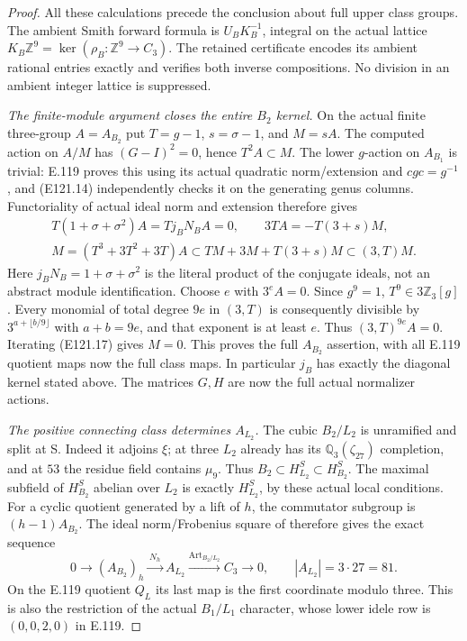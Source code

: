 \begin{proof}
All these calculations precede the conclusion about full
upper class groups. The ambient Smith forward formula is
$U_BK_B^{-1}$, integral on the actual lattice
$K_B\mathbb Z^9=\ker(\rho_B:\mathbb Z^9\to C_3)$.
The retained certificate encodes its ambient rational entries
exactly and verifies both inverse compositions. No division
in an ambient integer lattice is suppressed.

\emph{The finite-module argument closes the entire $B_2$ kernel.}
On the actual finite three-group $A=A_{B_2}$ put
$T=g-1$, $s=\sigma-1$, and $M=sA$.
The computed action on $A/M$ has $(G-I)^2=0$, hence
$T^2A\subset M$. The lower $g$-action on $A_{B_1}$ is trivial:
E.119 proves this using its actual quadratic norm/extension
and $cgc=g^{-1}$, and (E121.14) independently checks it on
the generating genus columns.
Functoriality of actual ideal norm and extension therefore gives
\[
 \begin{gathered}
 T(1+\sigma+\sigma^2)A=Tj_BN_BA=0,\qquad
 3TA=-T(3+s)M,\\
 M=(T^3+3T^2+3T)A
      \subset TM+3M+T(3+s)M\subset(3,T)M.
 \end{gathered}
 \tag{E121.17}
\]
Here $j_BN_B=1+\sigma+\sigma^2$ is the literal product of
the conjugate ideals, not an abstract module identification.
Choose $e$ with $3^eA=0$. Since $g^9=1$,
$T^9\in3\mathbb Z_3[g]$. Every monomial of total degree
$9e$ in $(3,T)$ is consequently divisible by
$3^{a+\lfloor b/9\rfloor}$ with $a+b=9e$, and that exponent
is at least $e$. Thus $(3,T)^{9e}A=0$.
Iterating (E121.17) gives $M=0$. This proves the full
$A_{B_2}$ assertion, with all E.119 quotient maps now
the full class maps. In particular $j_B$ has exactly the
diagonal kernel stated above. The matrices $G,H$ are now
the full actual normalizer actions.

\emph{The positive connecting class determines $A_{L_2}$.}
The cubic $B_2/L_2$ is unramified and split at S.
Indeed it adjoins $\xi$; at three $L_2$ already has its
$\mathbb Q_3(\zeta_{27})$ completion, and at $53$ the
residue field contains $\mu_9$.
Thus $B_2\subset H^S_{L_2}\subset H^S_{B_2}$.
The maximal subfield of $H^S_{B_2}$ abelian over $L_2$
is exactly $H^S_{L_2}$, by these actual local conditions.
For a cyclic quotient generated by a lift of $h$, the
commutator subgroup is $(h-1)A_{B_2}$. The ideal
norm/Frobenius square of \cite[V,Proposition3.3]{E_MilneCFT}
therefore gives the exact sequence
\[
 0\longrightarrow(A_{B_2})_h
   \xrightarrow{\,N_h\,} A_{L_2}
   \xrightarrow{\operatorname{Art}_{B_2/L_2}}C_3
   \longrightarrow0,\qquad |A_{L_2}|=3\cdot27=81.
 \tag{E121.18}
\]
On the E.119 quotient $Q_L$ its last map is the first
coordinate modulo three. This is also the restriction of
the actual $B_1/L_1$ character, whose lower idele row is
$(0,0,2,0)$ in E.119.


\end{proof}

